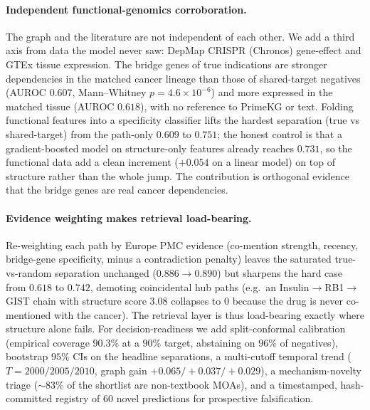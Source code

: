 \documentclass[11pt]{article}
\begin{document}
\paragraph{Independent functional-genomics corroboration.} The graph and the literature are
not independent of each other. We add a third axis from data the model never saw: DepMap
CRISPR (Chronos) gene-effect and GTEx tissue expression. The bridge genes of true
indications are stronger dependencies in the matched cancer lineage than those of
shared-target negatives (AUROC $0.607$, Mann--Whitney $p=4.6\times10^{-6}$) and more
expressed in the matched tissue (AUROC $0.618$), with no reference to PrimeKG or text.
Folding functional features into a specificity classifier lifts the hardest separation
(true vs shared-target) from the path-only $0.609$ to $0.751$; the honest control is that a
gradient-boosted model on structure-only features already reaches $0.731$, so the functional
data add a clean increment ($+0.054$ on a linear model) on top of structure rather than the
whole jump. The contribution is orthogonal evidence that the bridge genes are real cancer
dependencies.

\paragraph{Evidence weighting makes retrieval load-bearing.} Re-weighting each path by
Europe PMC evidence (co-mention strength, recency, bridge-gene specificity, minus a
contradiction penalty) leaves the saturated true-vs-random separation unchanged
($0.886\to0.890$) but sharpens the hard case from $0.618$ to $0.742$, demoting coincidental
hub paths (e.g.\ an Insulin$\to$RB1$\to$GIST chain with structure score $3.08$ collapses to
$0$ because the drug is never co-mentioned with the cancer). The retrieval layer is thus
load-bearing exactly where structure alone fails. For decision-readiness we add split-conformal
calibration (empirical coverage $90.3\%$ at a $90\%$ target, abstaining on $96\%$ of negatives),
bootstrap $95\%$ CIs on the headline separations, a multi-cutoff temporal trend
($T{=}2000/2005/2010$, graph gain $+0.065/+0.037/+0.029$), a mechanism-novelty triage ($\sim$83\%
of the shortlist are non-textbook MOAs), and a timestamped, hash-committed registry of 60 novel
predictions for prospective falsification.
\end{document}

